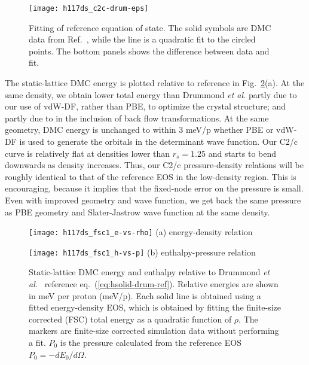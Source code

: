 \begin{figure}[h]
\centering
\texttt{[image: h117ds\_c2c-drum-eps]}
\caption{Fitting of reference equation of state. The solid symbols are DMC data from Ref.~\cite{Drummond2015}, while the line is a quadratic fit to the circled points. The bottom panels shows the difference between data and fit.}
\label{fig:hsolid-drum-eos}
\end{figure}

The static-lattice DMC energy is plotted relative to reference in Fig.~\ref{fig:static-qmc-vs-drummond}(a). At the same density, we obtain lower total energy than Drummond \textit{et al.} partly due to our use of vdW-DF, rather than  PBE, to optimize the crystal structure; and partly due to in the inclusion of back flow transformations. At the same geometry, DMC energy is unchanged to within 3 meV/p whether PBE or vdW-DF is used to generate the orbitals in the determinant wave function.
Our C2/c curve is relatively flat at densities lower than $r_s=1.25$ and starts to bend downwards as density increases.
Thus, our C2/c pressure-density relations will be roughly identical to that of the reference EOS in the low-density region.
This is encouraging, because it implies that the fixed-node error on the pressure is small.
Even with improved geometry and wave function, we get back the same pressure as PBE geometry and Slater-Jastrow wave function at the same density.

\begin{figure}[h]
\begin{minipage}{0.49\textwidth}
\centering
\texttt{[image: h117ds\_fsc1\_e-vs-rho]}
(a) energy-density relation
\end{minipage}
\begin{minipage}{0.49\textwidth}
\centering
\texttt{[image: h117ds\_fsc1\_h-vs-p]}
(b) enthalpy-pressure relation
\end{minipage}
\caption{Static-lattice DMC energy and enthalpy relative to Drummond \textit{et al.}~\cite{Drummond2015} reference eq.~(\ref{eq:hsolid-drum-ref}). Relative energies are shown in meV per proton (meV/p). Each solid line is obtained using a fitted energy-density EOS, which is obtained by fitting the finite-size corrected (FSC) total energy as a quadratic function of $\rho$. The markers are finite-size corrected simulation data without performing a fit. $P_0$ is the pressure calculated from the reference EOS $P_0=-dE_0/d\Omega$. \label{fig:static-qmc-vs-drummond}}
\end{figure}

